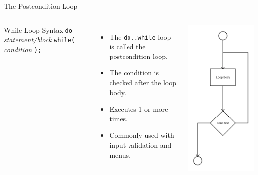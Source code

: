 \documentclass[]{beamer}
\begin{document}
\begin{frame}[fragile]{The Postcondition Loop}
  \begin{columns}

    \begin{block}{While Loop Syntax}
      \verb!do! 
      \newline\verb!    ! \textit{statement/block}
      \newline\verb!while(! \textit{condition} \verb!);! 
    \end{block}
    
    \vspace{0.3cm}

    \begin{itemize}[<+(1)->]
        \item The \texttt{do..while} loop is called the postcondition
        loop.
        \item The condition is checked after the loop body.
        \item Executes 1 or more times.
        \item Commonly used with input validation and menus.
    \end{itemize}

    \begin{center}
      \includegraphics[height=0.9\textheight]{images/do-while}
    \end{center}
  \end{columns}
\end{frame}
\end{document}
